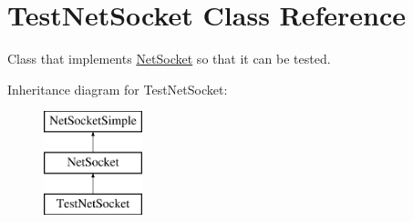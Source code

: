 \hypertarget{class_test_net_socket}{
\section{TestNetSocket Class Reference}
\label{class_test_net_socket}
}


Class that implements \hyperlink{class_net_socket}{NetSocket} so that it can be tested.  


Inheritance diagram for TestNetSocket:\begin{figure}[H]
\begin{center}
\leavevmode
\includegraphics[height=3.000000cm]{class_test_net_socket}
\end{center}
\end{figure}
